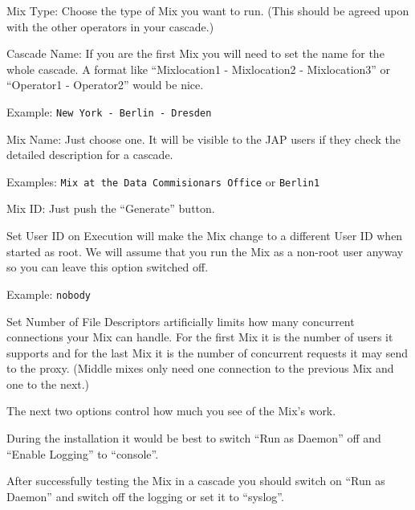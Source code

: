 \documentclass{article}
\begin{document}
\begin{description}

\item{Mix Type}: Choose the type of Mix you want to run. (This should be agreed upon
  with the other operators in your cascade.)

\item{Cascade Name}: If you are the first Mix you will need to set the name for the whole
  cascade.  A format like ``Mixlocation1 - Mixlocation2 - Mixlocation3''
  or ``Operator1 - Operator2'' would be nice. 
  
  Example: \verb|New York - Berlin - Dresden| 

\item{Mix Name}: Just choose one. It will be visible to the JAP users
  if they check the detailed description for a cascade.
  
  Examples: \verb|Mix at the Data Commisionars Office| or \verb|Berlin1|

\item{Mix ID}: Just push the ``Generate'' button.
  
\item{Set User ID on Execution} will make the Mix change to a
  different User ID when started as root. We will assume that you run
  the Mix as a non-root user anyway so you can leave this option
  switched off.

  Example: \texttt{nobody}
  
\item{Set Number of File Descriptors} artificially limits how many
  concurrent connections your Mix can handle. For the first Mix it is
  the number of users it supports and for the last Mix it is the
  number of concurrent requests it may send to the proxy. (Middle
  mixes only need one connection to the previous Mix and one to the
  next.)
  
\end{description}

The next two options control how much you see of the Mix's work.

During the installation it would be best to switch ``Run as Daemon''
off and ``Enable Logging'' to ``console''.

After successfully testing the Mix in a cascade you should switch on
``Run as Daemon'' and switch off the logging or set it to ``syslog''.
\end{document}
